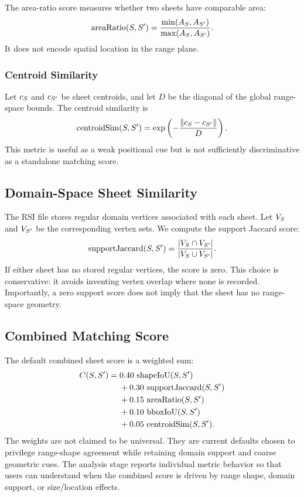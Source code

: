 The area-ratio score measures whether two sheets have comparable area:
\[
\operatorname{areaRatio}(S,S') =
\frac{\min(A_S,A_{S'})}{\max(A_S,A_{S'})}.
\]
It does not encode spatial location in the range plane.

\subsubsection{Centroid Similarity}

Let \(c_S\) and \(c_{S'}\) be sheet centroids, and let \(D\) be the
diagonal of the global range-space bounds. The centroid similarity is
\[
\operatorname{centroidSim}(S,S') =
\exp\left(-\frac{\|c_S-c_{S'}\|}{D}\right).
\]
This metric is useful as a weak positional cue but is not sufficiently
discriminative as a standalone matching score.

\subsection{Domain-Space Sheet Similarity}

The RSI file stores regular domain vertices associated with each sheet. Let
\(V_S\) and \(V_{S'}\) be the corresponding vertex sets. We compute
the support Jaccard score:
\[
\operatorname{supportJaccard}(S,S') =
\frac{|V_S\cap V_{S'}|}{|V_S\cup V_{S'}|}.
\]
If either sheet has no stored regular vertices, the score is zero. This choice
is conservative: it avoids inventing vertex overlap where none is recorded.
Importantly, a zero support score does not imply that the sheet has no
range-space geometry.

\subsection{Combined Matching Score}

The default combined sheet score is a weighted sum:
\[
\begin{aligned}
C(S,S') ={}&
0.40\,\operatorname{shapeIoU}(S,S') \\
&+0.30\,\operatorname{supportJaccard}(S,S') \\
&+0.15\,\operatorname{areaRatio}(S,S') \\
&+0.10\,\operatorname{bboxIoU}(S,S') \\
&+0.05\,\operatorname{centroidSim}(S,S').
\end{aligned}
\]
The weights are not claimed to be universal. They are current defaults chosen
to privilege range-shape agreement while retaining domain support and coarse
geometric cues. The analysis stage reports individual metric behavior so that
users can understand when the combined score is driven by range shape, domain
support, or size/location effects.

